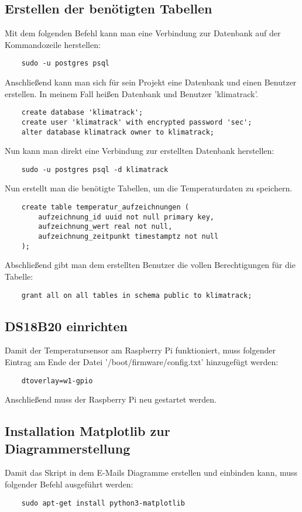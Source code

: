 \documentclass{article}
\begin{document}
\subsection{Erstellen der benötigten Tabellen}
Mit dem folgenden Befehl kann man eine Verbindung zur Datenbank auf der Kommandozeile herstellen:
\begin{verbatim}
    sudo -u postgres psql
\end{verbatim}
Anschließend kann man sich für sein Projekt eine Datenbank und einen Benutzer erstellen. In meinem Fall heißen Datenbank und Benutzer 'klimatrack'.
\begin{verbatim}
    create database 'klimatrack';
    create user 'klimatrack' with encrypted password 'sec';
    alter database klimatrack owner to klimatrack;
\end{verbatim}
Nun kann man direkt eine Verbindung zur erstellten Datenbank herstellen:
\begin{verbatim}
    sudo -u postgres psql -d klimatrack
\end{verbatim}
Nun erstellt man die benötigte Tabellen, um die Temperaturdaten zu speichern.
\begin{verbatim}
    create table temperatur_aufzeichnungen (
        aufzeichnung_id uuid not null primary key,
        aufzeichnung_wert real not null,
        aufzeichnung_zeitpunkt timestamptz not null
    );
\end{verbatim}
Abschließend gibt man dem erstellten Benutzer die vollen Berechtigungen für die Tabelle:
\begin{verbatim}
    grant all on all tables in schema public to klimatrack;
\end{verbatim}
\subsection{DS18B20 einrichten}
Damit der Temperatursensor am Raspberry Pi funktioniert, muss folgender Eintrag am Ende der Datei '/boot/firmware/config.txt' hinzugefügt werden:
\begin{verbatim}
    dtoverlay=w1-gpio
\end{verbatim}
Anschließend muss der Raspberry Pi neu gestartet werden.
\subsection{Installation Matplotlib zur Diagrammerstellung}
Damit das Skript in dem E-Mails Diagramme erstellen und einbinden kann, muss folgender Befehl ausgeführt werden:
\begin{verbatim}
    sudo apt-get install python3-matplotlib
\end{verbatim}
\end{document}

